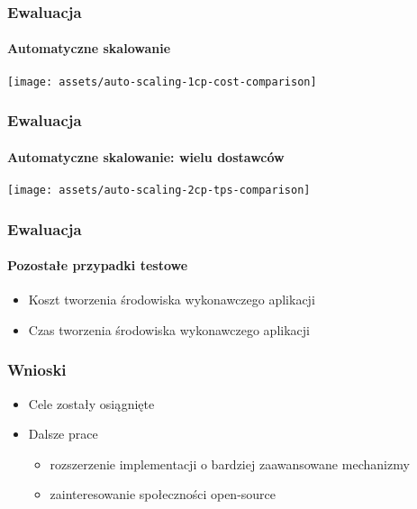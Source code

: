 \documentclass{beamer}
\begin{document}
\begin{frame}
\frametitle{Ewaluacja}
\framesubtitle{Automatyczne skalowanie}

\begin{center}
\texttt{[image: assets/auto-scaling-1cp-cost-comparison]}
\end{center}


\end{frame}



\begin{frame}
\frametitle{Ewaluacja}
\framesubtitle{Automatyczne skalowanie: wielu dostawców}

\begin{center}
\texttt{[image: assets/auto-scaling-2cp-tps-comparison]}
\end{center}

\end{frame}


\begin{frame}
\frametitle{Ewaluacja}
\framesubtitle{Pozostałe przypadki testowe}

\begin{itemize}
	\item Koszt tworzenia środowiska wykonawczego aplikacji
	\item Czas tworzenia środowiska wykonawczego aplikacji
\end{itemize}

\end{frame}


\begin{frame}
\frametitle{Wnioski}

\begin{itemize}
	\item Cele zostały osiągnięte
	\item Dalsze prace
		\begin{itemize}
			\item rozszerzenie implementacji o bardziej zaawansowane mechanizmy
			\item zainteresowanie społeczności open-source 
		\end{itemize}
\end{itemize}

\end{frame}
\end{document}
